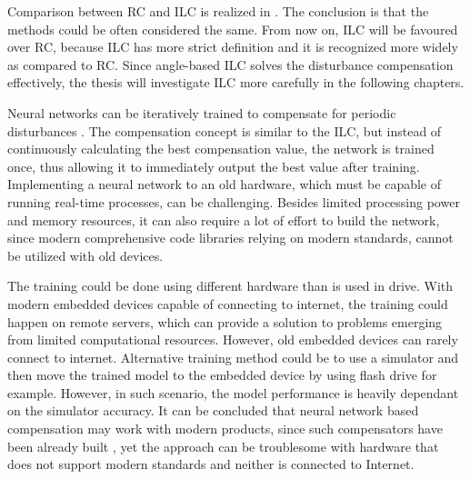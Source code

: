 Comparison between RC and ILC is realized in \cite{ILC:RC:R2R:2009}. The conclusion is that the methods could be often considered the same. From now on, ILC will be favoured over RC, because ILC has more strict definition \cite{ILC:1998} and it is recognized more widely \cite{ILC:RC:R2R:2009} as compared to RC. Since angle-based ILC solves the disturbance compensation effectively, the thesis will investigate ILC more carefully in the following chapters.

Neural networks can be iteratively trained to compensate for periodic disturbances \cite{CTR_SW:2017}. The compensation concept is similar to the ILC, but instead of continuously calculating the best compensation value, the network is trained once, thus allowing it to immediately output the best value after training. Implementing a neural network to an old hardware, which must be capable of running real-time processes, can be challenging. Besides limited processing power and memory resources, it can also require a lot of effort to build the network, since modern comprehensive code libraries relying on modern standards, cannot be utilized with old devices.

The training could be done using different hardware than is used in drive. With modern embedded devices capable of connecting to internet, the training could happen on remote servers, which can provide a solution to problems emerging from limited computational resources. However, old embedded devices can rarely connect to internet. Alternative training method could be to use a simulator and then move the trained model to the embedded device by using flash drive for example. However, in such scenario, the model performance is heavily dependant on the simulator accuracy. It can be concluded that neural network based compensation may work with modern products, since such compensators have been already built \cite{CTR_SW:2017}, yet the approach can be troublesome with hardware that does not support modern standards and neither is connected to Internet.

\clearpage
